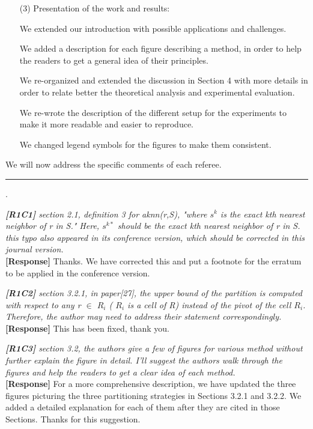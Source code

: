 \documentclass[11pt]{letter}
\newcommand{\svs}{\vspace{0.36ex}}
\newcommand{\stitle}[1]{\vspace{0.5ex} \noindent{\bf #1}}
\begin{document}
\begin{itemize}
%
\item[(3)] Presentation of the work and results:

We extended our introduction with possible applications and challenges.

We added a description for each figure describing a method, in order to help the readers to get a general idea
of their principles. 

We re-organized and extended the discussion in Section 4 with more details in order to relate better the theoretical 
analysis and experimental evaluation.

We re-wrote the description of the different setup for the experiments to make it more readable and easier to reproduce.

We changed legend symbols for the figures to make them consistent.

\end{itemize}



We will now address the specific comments of each referee. 

\vspace{3.6ex}
\hrule
\vspace{0.6ex}

\vspace{2ex} \stitle{Response to the comments of Referee 1}.

{\em
{\bf [R1C1]} section 2.1, definition 3 for aknn(r,S), "where $s^k$ is the exact kth nearest neighbor of r in S." Here, 
$s^{k*}$ should be the exact kth nearest neighbor of r in S. this typo also appeared in its conference version, which 
should be corrected in this journal version.}\\
\textbf{[Response]} Thanks. We have corrected this and put a footnote for the erratum to be applied in the conference 
version.


\svs
\noindent
{\em
{\bf [R1C2]}  section 3.2.1, in paper[27], the upper bound of the partition is computed with respect to any r $\in$ 
$R_i$ ( $R_i$ is a cell of R) instead of the pivot of the cell $R_i$. Therefore, the author may need to address their 
statement correspondingly.}\\
\textbf{[Response]}
This has been fixed, thank you.

\svs
\noindent
{\em
{\bf [R1C3]}  section 3.2, the authors give a few of figures for various method without further explain the figure in 
detail. I'll suggest the authors walk through the figures and help the readers to get a clear idea of each method.}\\
\textbf{[Response]}
For a more comprehensive description, we have updated the three figures picturing the three partitioning strategies in Sections 3.2.1 and 3.2.2. We added a detailed explanation for each of them after they are cited in those Sections. Thanks for this suggestion.
\end{document}
